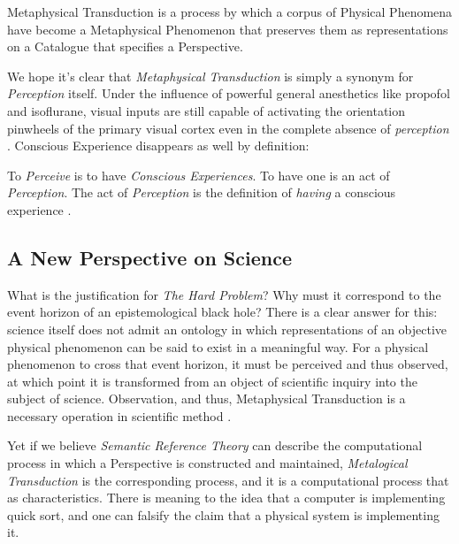 \documentclass[runningheads]{llncs}
\begin{document}
\begin{assertion}
Metaphysical Transduction is a process by which a corpus of Physical Phenomena have become a Metaphysical Phenomenon that preserves them as representations on a Catalogue that specifies a Perspective.    
\end{assertion}

We hope it's clear that \emph{Metaphysical Transduction} is simply a synonym for \emph{Perception} itself. Under the influence of powerful general anesthetics like propofol and isoflurane, visual inputs are still capable of activating the orientation pinwheels of the primary visual cortex even in the complete absence of \emph{perception} \cite{Bugrova2020}\cite{Khan2024}. Conscious Experience disappears as well by definition:

\begin{assertion}
	To \emph{Perceive} is to have \emph{Conscious Experiences}. To have one is an act of \emph{Perception}. The act of \emph{Perception} is the definition of \emph{having} a conscious experience \cite{Formalism}.
\end{assertion}


\subsection{A New Perspective on Science}

What is the justification for \emph{The Hard Problem}? Why must it correspond to the event horizon of an epistemological black hole? There is a clear answer for this: science itself does not admit an ontology in which representations of an objective physical phenomenon can be said to exist in a meaningful way. For a physical phenomenon to cross that event horizon, it must be perceived and thus observed, at which point it is transformed from an object of scientific inquiry into the subject of science. Observation, and thus, Metaphysical Transduction is a necessary operation in scientific method \cite{Popper1959}.

Yet if we believe \emph{Semantic Reference Theory} can describe the computational process in which a Perspective is constructed and maintained, \emph{Metalogical Transduction} is the corresponding process, and it is a computational process that as characteristics. There is meaning to the idea that a computer is implementing quick sort, and one can falsify the claim that a physical system is implementing it.
\end{document}
